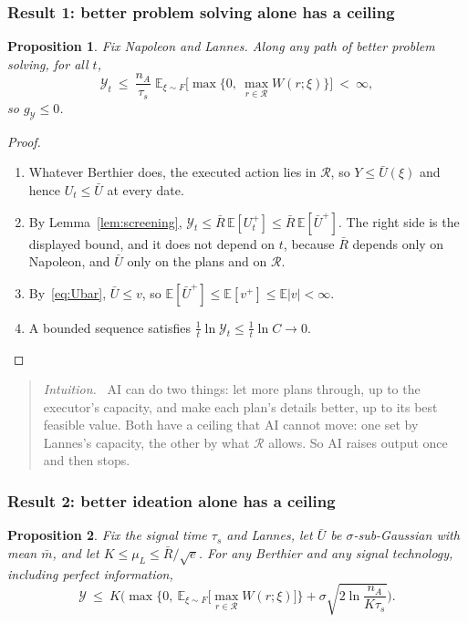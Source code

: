 \documentclass[11pt]{article}
\newcommand{\Nap}{\textcolor{nap}{Napoleon}}
\newcommand{\Ber}{\textcolor{ber}{Berthier}}
\newcommand{\Lan}{\textcolor{lan}{Lannes}}
\newtheorem{proposition}{Proposition}
\theoremstyle{remark}
\newenvironment{intuition}{\begin{quote}\small\color{muted}\textit{Intuition.}\ }{\end{quote}}
\newcommand{\E}{\mathbb{E}}
\newcommand{\Ycal}{\mathcal{Y}}
\newcommand{\Rcal}{\mathcal{R}}
\begin{document}
\subsubsection*{Result 1: better problem solving alone has a ceiling}

\begin{proposition}\label{prop:ai}
Fix \Nap{} and \Lan. Along any path of better problem solving, for all $t$,
\[
\Ycal_t\ \le\ \frac{n_A}{\tau_s}\;\E_{\xi\sim F}\Big[\max\Big\{0,\ \max_{r\in\Rcal}W(r;\xi)\Big\}\Big]\ <\ \infty,
\]
so $g_{\Ycal}\le0$.
\end{proposition}

\begin{proof}
\begin{enumerate}
  \item Whatever \Ber{} does, the executed action lies in $\Rcal$, so $Y\le\bar U(\xi)$ and hence $U_t\le\bar U$ at every date.
  \item By Lemma~\ref{lem:screening}, $\Ycal_t\le\bar R\,\E[U_t^+]\le\bar R\,\E[\bar U^+]$. The right side is the displayed bound, and it does not depend on $t$, because $\bar R$ depends only on \Nap, and $\bar U$ only on the plans and on $\Rcal$.
  \item By~\eqref{eq:Ubar}, $\bar U\le v$, so $\E[\bar U^+]\le\E[v^+]\le\E|v|<\infty$.
  \item A bounded sequence satisfies $\frac1t\ln\Ycal_t\le\frac1t\ln C\to0$. \qedhere
\end{enumerate}
\end{proof}

\begin{intuition}
AI can do two things: let more plans through, up to the executor's capacity, and make each plan's details better, up to its best feasible value. Both have a ceiling that AI cannot move: one set by \Lan's capacity, the other by what $\Rcal$ allows. So AI raises output once and then stops.
\end{intuition}

\subsubsection*{Result 2: better ideation alone has a ceiling}

\begin{proposition}\label{prop:judgment}
Fix the signal time $\tau_s$ and \Lan, let $\bar U$ be $\sigma$-sub-Gaussian with mean $\bar m$, and let $K\le\mu_L\le\bar R/\sqrt e$. For any \Ber{} and any signal technology, including perfect information,
\[
\Ycal\ \le\ K\bigg(\max\Big\{0,\ \E_{\xi\sim F}\Big[\max_{r\in\Rcal}W(r;\xi)\Big]\Big\}+\sigma\sqrt{2\ln\frac{n_A}{K\tau_s}}\bigg).
\]
\end{proposition}
\end{document}
